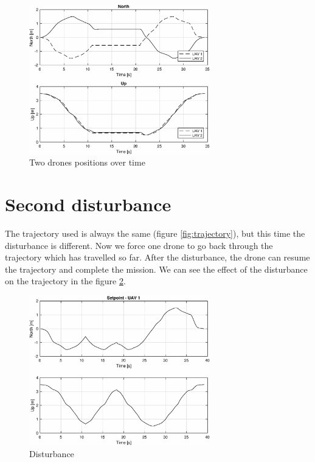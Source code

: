 \begin{figure}
\centering
\includegraphics[width=0.7\textwidth]{chapters/chapter-04/figures/overlapped_1.eps}
\caption{Two drones positions over time}
\label{fig:overlapped_1}
\end{figure}


\section{Second disturbance}
The trajectory used is always the same (figure \ref{fig:trajectory}), but this time
the disturbance is different. Now we force one drone to go back through the trajectory
which has travelled so far.
After the disturbance, the drone can resume the trajectory and complete the mission.
We can see the effect of the disturbance on the trajectory in the figure \ref{fig:disturbance_2}.

\begin{figure}
\centering
\includegraphics[width=0.7\textwidth]{chapters/chapter-04/figures/pos_2.eps}
\caption{Disturbance}
\label{fig:disturbance_2}
\end{figure}

